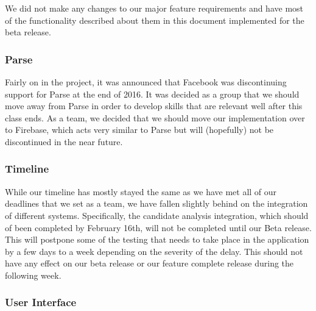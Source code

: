 \documentclass[11pt]{article}
\begin{document}
We did not make any changes to our major feature requirements and have most of the functionality described about them in this document implemented for the beta release.

\subsubsection{Parse}

Fairly on in the project, it was announced that Facebook was discontinuing support for Parse at the end of 2016. It was decided as a group that we should move away from Parse in order to develop skills that are relevant well after this class ends. As a team, we decided that we should move our implementation over to Firebase, which acts very similar to Parse but will (hopefully) not be discontinued in the near future.

\subsubsection{Timeline}

While our timeline has mostly stayed the same as we have met all of our deadlines that we set as a team, we have fallen slightly behind on the integration of different systems. Specifically, the candidate analysis integration, which should of been completed by February 16th, will not be completed until our Beta release. This will postpone some of the testing that needs to take place in the application by a few days to a week depending on the severity of the delay. This should not have any effect on our beta release or our feature complete release during the following week.

\subsubsection{User Interface}
\end{document}
